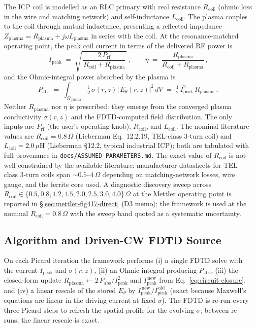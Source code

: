\documentclass[11pt,a4paper]{report}
\begin{document}
The ICP coil is modelled as an RLC primary with real resistance $R_\mathrm{coil}$ (ohmic loss in the wire and matching network) and self-inductance $L_\mathrm{coil}$.  The plasma couples to the coil through mutual inductance, presenting a reflected impedance $Z_\mathrm{plasma} = R_\mathrm{plasma} + j\omega L_\mathrm{plasma}$ in series with the coil.  At the resonance-matched operating point, the peak coil current in terms of the delivered RF power is
\begin{equation}
  \boxed{\,I_\mathrm{peak} \;=\; \sqrt{\,\dfrac{2\,P_\mathrm{rf}}{R_\mathrm{coil} + R_\mathrm{plasma}}\,}\,,\qquad \eta \;=\; \dfrac{R_\mathrm{plasma}}{R_\mathrm{coil} + R_\mathrm{plasma}}\,,}
  \label{eq:circuit-closure}
\end{equation}
and the Ohmic-integral power absorbed by the plasma is
\begin{equation}
  P_\mathrm{abs} \;=\; \int_{\Omega_\mathrm{plasma}} \tfrac{1}{2}\,\sigma(r,z)\,|E_\theta(r,z)|^2\, dV \;=\; \tfrac{1}{2}\,I_\mathrm{peak}^2\,R_\mathrm{plasma}\,.
  \label{eq:Ohmic-integral}
\end{equation}
Neither $R_\mathrm{plasma}$ nor $\eta$ is prescribed: they emerge from the converged plasma conductivity $\sigma(r,z)$ and the FDTD-computed field distribution.  The only inputs are $P_\mathrm{rf}$ (the user's operating knob), $R_\mathrm{coil}$, and $L_\mathrm{coil}$.  The nominal literature values are $R_\mathrm{coil} = 0.8\,\Omega$ (Lieberman Eq.~12.2.19, TEL-class 3-turn coil) and $L_\mathrm{coil} = 2.0\,\mu\mathrm{H}$ (Lieberman §12.2, typical industrial ICP); both are tabulated with full provenance in \texttt{docs/ASSUMED\_PARAMETERS.md}.  The exact value of $R_\mathrm{coil}$ is not well-constrained by the available literature: manufacturer datasheets for TEL-class 3-turn coils span $\sim\!0.5$--$4\,\Omega$ depending on matching-network losses, wire gauge, and the ferrite core used.  A diagnostic discovery sweep across $R_\mathrm{coil} \in \{0.5, 0.8, 1.2, 1.5, 2.0, 2.5, 3.0, 4.0\}\,\Omega$ at the Mettler operating point is reported in \S\ref{sec:mettler-fig417-direct} (D3 memo); the framework is used at the nominal $R_\mathrm{coil} = 0.8\,\Omega$ with the sweep band quoted as a systematic uncertainty.

\subsection{Algorithm and Driven-CW FDTD Source}

On each Picard iteration the framework performs (i) a single FDTD solve with the current $I_\mathrm{peak}$ and $\sigma(r,z)$, (ii) an Ohmic integral producing $P_\mathrm{abs}$, (iii) the closed-form update $R_\mathrm{plasma} \leftarrow 2\,P_\mathrm{abs}/I_\mathrm{peak}^2$ and $I_\mathrm{peak}^{\,\mathrm{new}}$ from Eq.~\ref{eq:circuit-closure}, and (iv) a linear rescale of the stored $E_\theta$ by $I_\mathrm{peak}^{\,\mathrm{new}}/I_\mathrm{peak}^{\,\mathrm{old}}$ (exact because Maxwell's equations are linear in the driving current at fixed $\sigma$).  The FDTD is re-run every three Picard steps to refresh the spatial profile for the evolving $\sigma$; between re-runs, the linear rescale is exact.
\end{document}
